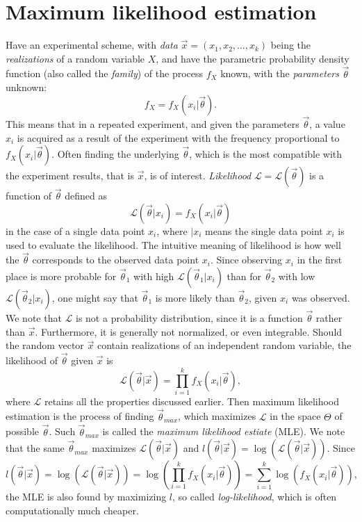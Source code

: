 \section{Maximum likelihood estimation} \label{ch:mle}

Have an experimental scheme, with \textit{data} $\vec{x} = (x_1, x_2, \dots , x_k)$ being the \textit{realizations} of a random variable $X$, and have the parametric probability density function (also called the \textit{family}) of the process $f_X$ known, with the \textit{parameters} $\vec{\theta}$ unknown:
\begin{equation}
    f_X = f_X(x_i|\vec{\theta}). \label{eq:stat_experiment}
\end{equation}
This means that in a repeated experiment, and given the parameters $\vec{\theta}$, a value $x_i$ is acquired as a result of the experiment with the frequency proportional to $f_X(x_i|\vec{\theta})$. Often finding the underlying $\vec{\theta}$, which is the most compatible with the experiment results, that is $\vec{x}$, is of interest. \textit{Likelihood} $\mathcal{L}=\mathcal{L}(\vec{\theta})$ is a function of $\vec{\theta}$ defined as 
\begin{equation}
    \mathcal{L}(\vec{\theta}|x_i) = f_X(x_i|\vec{\theta})
\end{equation}
in the case of a single data point $x_i$, where $|x_i$ means the single data point $x_i$ is used to evaluate the likelihood. The intuitive meaning of likelihood is how well the $\vec{\theta}$ corresponds to the observed data point $x_i$. Since observing $x_i$ in the first place is more probable for $\vec{\theta}_1$ with high $\mathcal{L}(\vec{\theta}_1|x_i)$ than for $\vec{\theta}_2$ with low $\mathcal{L}(\vec{\theta}_2|x_i)$, one might say that $\vec{\theta}_1$ is more likely than $\vec{\theta}_2$, given $x_i$ was observed. We note that $\mathcal{L}$ is not a probability distribution, since it is a function $\vec{\theta}$ rather than $\vec{x}$. Furthermore, it is generally not normalized, or even integrable. Should the random vector $\vec{x}$ contain realizations of an independent random variable, the likelihood of $\vec{\theta}$ given $\vec{x}$ is 
\begin{equation}
    \mathcal{L}(\vec{\theta}|\vec{x}) = \prod_{i=1}^k f_X(x_i|\vec{\theta}),
\end{equation}
where $\mathcal{L}$ retains all the properties discussed earlier. Then maximum likelihood estimation is the process of finding $\vec{\theta}_{max}$, which maximizes $\mathcal{L}$ in the space $\Theta$ of possible $\vec{\theta}$. Such $\vec{\theta}_{max}$ is called the \textit{maximum likelihood estiate} (MLE). We note that the same $\vec{\theta}_{max}$ maximizes $\mathcal{L}(\vec{\theta}|\vec{x})$ and $l(\vec{\theta}|\vec{x}) = \log \left( \mathcal{L}(\vec{\theta}|\vec{x}) \right)$. Since 
\begin{equation}
    l(\vec{\theta}|\vec{x}) = \log \left( \mathcal{L}(\vec{\theta}|\vec{x}) \right) = \log \left( \prod_{i=1}^k f_X(x_i|\vec{\theta}) \right) =  \sum_{i=1}^k \log \left( f_X(x_i|\vec{\theta}) \right),
\end{equation}
the MLE is also found by maximizing $l$, so called \textit{log-likelihood}, which is often computationally much cheaper. 

